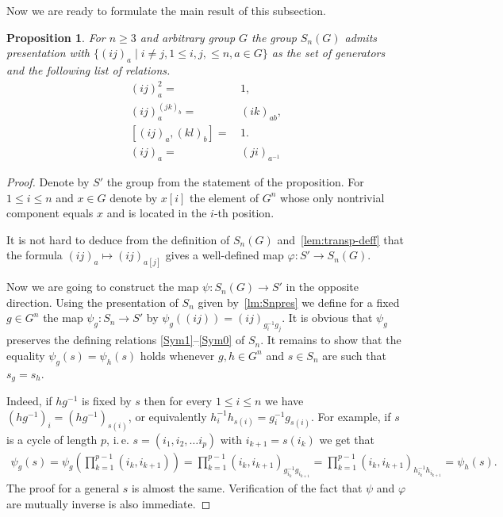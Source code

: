 \documentclass[oneside, 10pt]{amsart}
\theoremstyle{plain}
\numberwithin{equation}{section}
\numberwithin{lemma}{section}
\newtheorem{prop}[lemma]{Proposition}
\theoremstyle{remark}
\theoremstyle{definition}
\begin{document}
Now we are ready to formulate the main result of this subsection.
\begin{prop} \label{prop:Q-pres} For $n\geq 3$ and arbitrary group $G$ the group $S_n(G)$ admits presentation with $\{(ij)_a \mid i\neq j, 1\leq i,j,\leq n, a\in G\}$ 
as the set of generators and the following list of relations. %
\begin{align}
(ij)_a^2 = &\, 1,                \label{Q1} \tag{SG1} \\
(ij)_a^{(jk)_b} = &\, (ik)_{ab}, \label{Q2} \tag{SG2} \\
[(ij)_a, (kl)_b] = &\,1.         \label{Q3} \tag{SG3} \\
(ij)_a =&\, (ji)_{a^{-1}}        \label{Q4} \tag{SG4} 
\end{align}
\end{prop}
\begin{proof}
Denote by $S'$ the group from the statement of the proposition.
For $1\leq i\leq n$ and $x\in G$ denote by $x[i]$ the element of $G^n$ 
 whose only nontrivial component equals $x$ and is located in the $i$-th position.

It is not hard to deduce from the definition of $S_n(G)$ and~\cref{lem:transp-deff} 
 that the formula $(ij)_a \mapsto (ij)_{a[j]}$ gives a well-defined map $\varphi\colon S'\to S_n(G)$.

Now we are going to construct the map $\psi\colon S_n(G)\to S'$ in the opposite direction. 
Using the presentation of $S_n$ given by~\cref{lm:Snpres}  we define for a fixed $g\in G^n$ the map 
 $\psi_g\colon S_n \to S'$ by $\psi_g((ij)) = (ij)_{g_i^{-1} g_j}.$
It is obvious that $\psi_g$ preserves the defining relations \eqref{Sym1}--\eqref{Sym0} of $S_n$. 
It remains to show that the equality $\psi_g(s) = \psi_h(s)$ holds whenever $g, h\in G^n$ and $s\in S_n$ are such that $s_g=s_h$.

Indeed, if $hg^{-1}$ is fixed by $s$ then for every $1\leq i\leq n$ we have $(hg^{-1})_i = (hg^{-1})_{s(i)}$, or equivalently
$h_i^{-1} h_{s(i)} = g_i^{-1} g_{s(i)}$. %
For example, if $s$ is a cycle of length $p$, i.\,e. $s=(i_1, i_2, \ldots i_p)$ with $i_{k+1} = s(i_k)$ we get that
\begin{multline} \nonumber
 \psi_g(s) = \psi_g\left({\prod\limits_{k=1}^{p-1}(i_k, i_{k+1})}\right) = 
 \prod\limits_{k=1}^{p-1}\left(i_k, i_{k+1}\right)_{g_{i_k}^{-1} g_{i_{k+1}}} = 
 \prod\limits_{k=1}^{p-1}\left(i_k, i_{k+1}\right)_{h_{i_k}^{-1} h_{i_{k+1}}} = \psi_h(s).
\end{multline}
The proof for a general $s$ is almost the same.
Verification of the fact that $\psi$ and $\varphi$ are mutually inverse is also immediate.
\end{proof}
\end{document}
